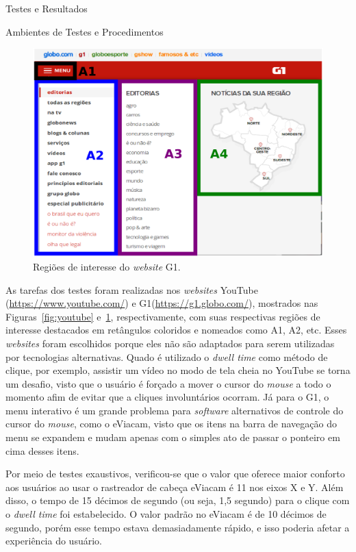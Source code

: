 \begin{chapter}{Testes e Resultados}
\begin{section}{Ambientes de Testes e Procedimentos}
\begin{figure}[!h]
	\centering
	\includegraphics[width=1.00\linewidth]{fig/g1}
	\caption{Regiões de interesse do \textit{website} G1.}
	\label{fig:g1}
\end{figure}

As tarefas dos testes foram realizadas nos \textit{websites} YouTube
(\url{https://www.youtube.com/}) e G1(\url{https://g1.globo.com/}), mostrados
nas Figuras~\ref{fig:youtube} e~\ref{fig:g1}, respectivamente, com suas
respectivas regiões de interesse destacados em retângulos coloridos e nomeados
como A1, A2, etc. Esses \textit{websites} foram escolhidos porque eles não são
adaptados para serem utilizadas por tecnologias alternativas. Quado é utilizado
o \textit{dwell time} como método de clique, por exemplo, assistir um vídeo no
modo de tela cheia no YouTube se torna um desafio, visto que o usuário é forçado
a mover o cursor do \textit{mouse} a todo o momento afim de evitar que a cliques
involuntários ocorram. Já para o G1, o menu interativo é um grande problema para
\textit{software} alternativos de controle do cursor do \textit{mouse}, como o
eViacam, visto que os itens na barra de navegação do menu se expandem
e mudam apenas com o simples ato de passar o ponteiro em cima desses itens.

Por meio de testes exaustivos, verificou-se que o valor que oferece maior
conforto aos usuários ao usar o rastreador de cabeça eViacam é 11 nos eixos X e
Y. Além disso, o tempo de 15 décimos de segundo (ou seja, 1,5 segundo) para o
clique com o \textit{dwell time} foi estabelecido. O valor padrão no eViacam é
de 10 décimos de segundo, porém esse tempo estava demasiadamente rápido, e isso
poderia afetar a experiência do usuário.


\end{section}
\end{chapter}
